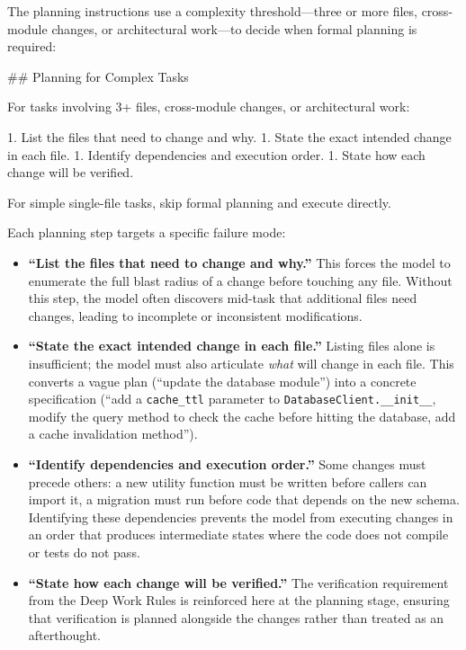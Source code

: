 \documentclass{article}
\begin{document}
The planning instructions use a complexity threshold---three or more
files, cross-module changes, or architectural work---to decide when
formal planning is required:

\begin{prompt}
## Planning for Complex Tasks

For tasks involving 3+ files, cross-module changes, or
architectural work:

1. List the files that need to change and why.
1. State the exact intended change in each file.
1. Identify dependencies and execution order.
1. State how each change will be verified.

For simple single-file tasks, skip formal planning and
execute directly.
\end{prompt}

\noindent Each planning step targets a specific failure mode:

\begin{itemize}[nosep]
\item \textbf{``List the files that need to change and why.''}  This
  forces the model to enumerate the full blast radius of a change
  before touching any file.  Without this step, the model often
  discovers mid-task that additional files need changes, leading to
  incomplete or inconsistent modifications.

\item \textbf{``State the exact intended change in each file.''}
  Listing files alone is insufficient; the model must also articulate
  \emph{what} will change in each file.  This converts a vague plan
  (``update the database module'') into a concrete specification
  (``add a \texttt{cache\_ttl} parameter to
  \texttt{DatabaseClient.\_\_init\_\_}, modify the query method to
  check the cache before hitting the database, add a cache
  invalidation method'').

\item \textbf{``Identify dependencies and execution order.''}  Some
  changes must precede others: a new utility function must be written
  before callers can import it, a migration must run before code that
  depends on the new schema.  Identifying these dependencies prevents
  the model from executing changes in an order that produces
  intermediate states where the code does not compile or tests do not
  pass.

\item \textbf{``State how each change will be verified.''}  The
  verification requirement from the Deep Work Rules is reinforced here
  at the planning stage, ensuring that verification is planned
  alongside the changes rather than treated as an afterthought.
\end{itemize}
\end{document}

